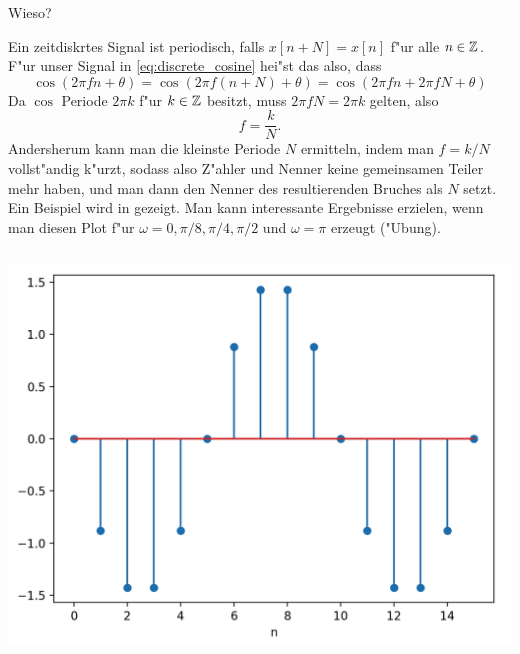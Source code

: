 Wieso?

Ein zeitdiskrtes Signal ist periodisch, falls $x[n + N] = x[n]$ f"ur alle $n \in \mathbb{Z}$.
F"ur unser Signal in \eqref{eq:discrete_cosine} hei"st das also, dass
\[
    \cos(2 \pi f n + \theta) 
        = \cos(2 \pi f (n + N) + \theta)
        = \cos(2 \pi f n + 2 \pi f N + \theta)
\]
Da $\cos$ Periode $2\pi k$ f"ur $k \in \mathbb{Z}$ besitzt, muss $2 \pi f N = 2 \pi k$ gelten, also
\[
    f = \frac kN.
\]
Andersherum kann man die kleinste Periode $N$ ermitteln, indem man $f = k/N$ vollst"andig k"urzt, sodass also Z"ahler und Nenner keine gemeinsamen Teiler mehr haben, und man dann den Nenner des resultierenden Bruches als $N$ setzt. 
Ein Beispiel wird in  gezeigt. 
Man kann interessante Ergebnisse erzielen, wenn man diesen Plot f"ur $\omega=0,\pi/8,\pi/4,\pi/2$ und $\omega=\pi$ erzeugt ("Ubung).
%
\begin{listing}
    \noindent
    \begin{minipage}{0.49\textwidth}
        \strut\vspace*{-\baselineskip}\newline
        \inputminted[firstline=4]{python3}{code/disc_harms.py}
    \end{minipage}%
    \begin{minipage}{0.49\textwidth}
        \strut\vspace*{-\baselineskip}\newline
        \includegraphics[width=\textwidth]{code/disc_harms.png}
    \end{minipage}
    \label{py:disc_harms}
\end{listing}

